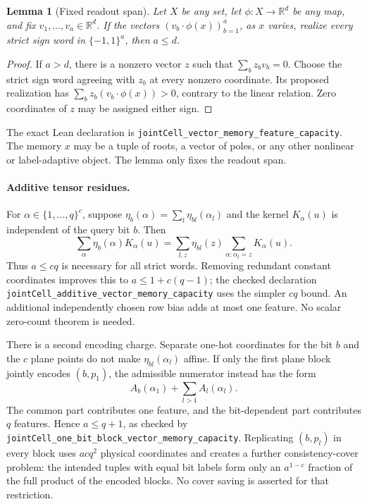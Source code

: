 \documentclass{article}
\newtheorem{lemma}{Lemma}
\begin{document}
\begin{lemma}[Fixed readout span]
Let $X$ be any set, let $\phi:X\to\mathbb R^d$ be any map, and fix
$v_1,\ldots,v_a\in\mathbb R^d$. If the vectors
$(v_b\cdot\phi(x))_{b=1}^a$, as $x$ varies, realize every strict sign
word in $\{-1,1\}^a$, then $a\le d$.
\end{lemma}
\begin{proof}
If $a>d$, there is a nonzero vector $z$ such that $\sum_bz_bv_b=0$.
Choose the strict sign word agreeing with $z_b$ at every nonzero
coordinate. Its proposed realization has
$\sum_b z_b(v_b\cdot\phi(x))>0$, contrary to the linear relation.
Zero coordinates of $z$ may be assigned either sign.
\end{proof}
The exact Lean declaration is
\texttt{jointCell\_vector\_memory\_feature\_capacity}.
The memory $x$ may be a tuple of roots, a vector of poles, or any other
nonlinear or label-adaptive object. The lemma only fixes the readout span.

\paragraph{Additive tensor residues.}
For $\alpha\in\{1,\ldots,q\}^c$, suppose
$\eta_b(\alpha)=\sum_l\eta_{bl}(\alpha_l)$ and the kernel
$K_\alpha(u)$ is independent of the query bit $b$. Then
\[
 \sum_\alpha\eta_b(\alpha)K_\alpha(u)
 =\sum_{l,z}\eta_{bl}(z)
      \sum_{\alpha:\alpha_l=z}K_\alpha(u).
\]
Thus $a\le cq$ is necessary for all strict words. Removing redundant
constant coordinates improves this to $a\le1+c(q-1)$; the checked
declaration \texttt{jointCell\_additive\_vector\_memory\_capacity}
uses the simpler $cq$ bound. An additional independently chosen row bias
adds at most one feature. No scalar zero-count theorem is needed.

There is a second encoding charge. Separate one-hot coordinates for the
bit $b$ and the $c$ plane points do not make $\eta_{bl}(\alpha_l)$
affine. If only the first plane block jointly encodes $(b,p_1)$, the
admissible numerator instead has the form
\[
 A_b(\alpha_1)+\sum_{l>1}A_l(\alpha_l).
\]
The common part contributes one feature, and the bit-dependent part
contributes $q$ features. Hence $a\le q+1$, as checked by
\texttt{jointCell\_one\_bit\_block\_vector\_memory\_capacity}.
Replicating $(b,p_l)$ in every block uses $acq^2$ physical coordinates
and creates a further consistency-cover problem: the intended tuples
with equal bit labels form only an $a^{1-c}$ fraction of the full product
of the encoded blocks. No cover saving is asserted for that restriction.
\end{document}
